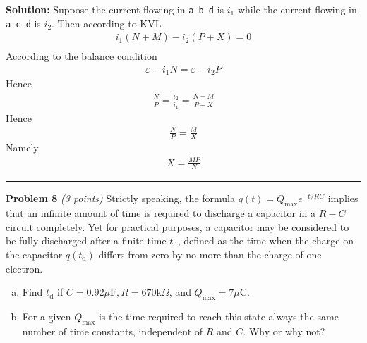 \documentclass[a4paper, 11pt]{article}
\newenvironment{problem}[3][Problem]
    { \begin{mdframed}[backgroundcolor=gray!20] \textbf{#1 #2} \textit{(#3 points)} }
    {  \end{mdframed}}
\newenvironment{solution}
    {\textbf{Solution:}}
    {}
\begin{document}
\begin{solution}
	Suppose the current flowing in \texttt{a-b-d} is $i_1$ while the current flowing
	in \texttt{a-c-d} is $i_2$. Then according to KVL
	\begin{align}
		i_1(N+M) - i_2(P+X) = 0 \\
	\end{align}
	According to the balance condition
	\begin{align}
		\varepsilon - i_1N = \varepsilon - i_2P
	\end{align}
	Hence
	\begin{align*}
		\frac{N}{P} = \frac{i_2}{i_1} = \frac{N+M}{P+X}
	\end{align*}
	Hence
	\begin{align*}
		\frac{N}{P} = \frac{M}{X}
	\end{align*}
	Namely
	\begin{align}
		X = \frac{MP}{N}
	\end{align}
\end{solution}

\noindent\rule{7.1in}{2.8pt}

\begin{problem}{8}{3}
Strictly speaking, the formula $q(t)=Q_{\max } e^{-t / R C}$ implies that an infinite amount of time is required to discharge a capacitor
in a $R-C$ circuit completely. Yet for practical purposes, a capacitor may be considered to be fully discharged after a finite time
$t_{\mathrm{d}}$, defined as the time when the charge on the capacitor $q\left(t_{\mathrm{d}}\right)$ differs from zero by no more than
the charge of one electron.
\begin{enumerate}[(a)]
	\item Find $t_{\mathrm{d}}$ if $C=0.92 \mu \mathrm{F}, R=670 \mathrm{k} \Omega$, and $Q_{\max }=7 \mu \mathrm{C}$.
	\item For a given $Q_{\max }$ is the time required to reach this state always the same number of time constants, independent of $R$ and $C .$ Why or why not?
\end{enumerate}
\end{problem}
\end{document}
